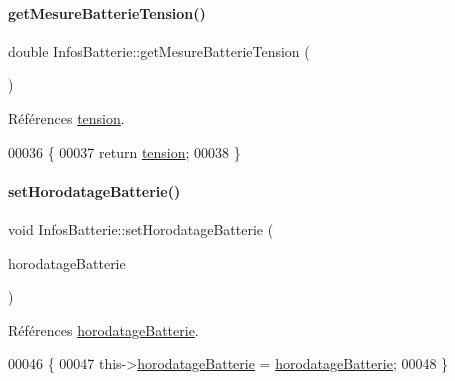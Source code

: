 \paragraph{\texorpdfstring{get\+Mesure\+Batterie\+Tension()}{getMesureBatterieTension()}}
{\footnotesize\ttfamily double Infos\+Batterie\+::get\+Mesure\+Batterie\+Tension (\begin{DoxyParamCaption}{ }\end{DoxyParamCaption})}



Références \hyperlink{class_infos_batterie_a45d09805075337f7f2d4b84d02a2ee47}{tension}.


\begin{DoxyCode}
00036 \{
00037     \textcolor{keywordflow}{return} \hyperlink{class_infos_batterie_a45d09805075337f7f2d4b84d02a2ee47}{tension};
00038 \}
\end{DoxyCode}
\mbox{\label{class_infos_batterie_a1d98a79696389d0264959d0c8a64bbcd}} 
\paragraph{\texorpdfstring{set\+Horodatage\+Batterie()}{setHorodatageBatterie()}}
{\footnotesize\ttfamily void Infos\+Batterie\+::set\+Horodatage\+Batterie (\begin{DoxyParamCaption}\item[{Q\+String}]{horodatage\+Batterie }\end{DoxyParamCaption})}



Références \hyperlink{class_infos_batterie_a261067aff87023bccd60e59961ef1ffc}{horodatage\+Batterie}.


\begin{DoxyCode}
00046 \{
00047     this->\hyperlink{class_infos_batterie_a261067aff87023bccd60e59961ef1ffc}{horodatageBatterie} = \hyperlink{class_infos_batterie_a261067aff87023bccd60e59961ef1ffc}{horodatageBatterie};
00048 \}
\end{DoxyCode}
\mbox{\label{class_infos_batterie_ab1b2945b7d7c1a6207e29369690a27b9}} 
